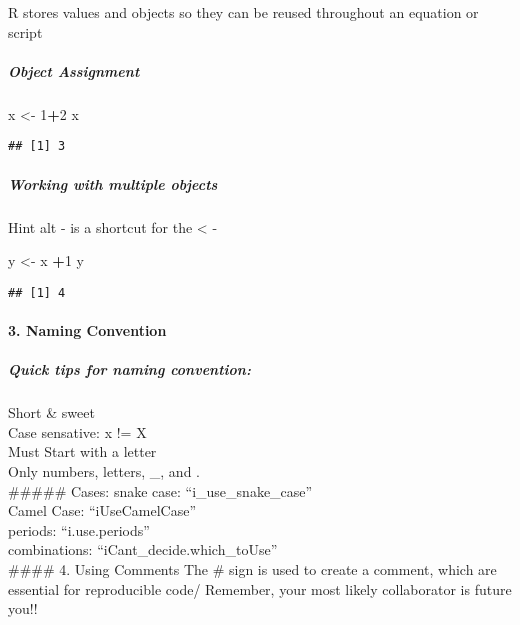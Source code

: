 \documentclass[]{article}
\newenvironment{Shaded}{\begin{snugshade}}{\end{snugshade}}
\newcommand{\DecValTok}[1]{\textcolor[rgb]{0.00,0.00,0.81}{#1}}
\newcommand{\StringTok}[1]{\textcolor[rgb]{0.31,0.60,0.02}{#1}}
\newcommand{\OperatorTok}[1]{\textcolor[rgb]{0.81,0.36,0.00}{\textbf{#1}}}
\newcommand{\NormalTok}[1]{#1}
\let\oldparagraph\paragraph
\renewcommand{\paragraph}[1]{\oldparagraph{#1}\mbox{}}
\let\oldsubparagraph\subparagraph
\renewcommand{\subparagraph}[1]{\oldsubparagraph{#1}\mbox{}}
\begin{document}
R stores values and objects so they can be reused throughout an equation
or script

\subparagraph{Object Assignment}\label{object-assignment}

\begin{Shaded}
\begin{Highlighting}[]
\NormalTok{x <-}\StringTok{ }\DecValTok{1}\OperatorTok{+}\DecValTok{2}
\NormalTok{x}
\end{Highlighting}
\end{Shaded}

\begin{verbatim}
## [1] 3
\end{verbatim}

\subparagraph{Working with multiple
objects}\label{working-with-multiple-objects}

Hint alt - is a shortcut for the \textless{} -

\begin{Shaded}
\begin{Highlighting}[]
\NormalTok{y <-}\StringTok{ }\NormalTok{x }\OperatorTok{+}\DecValTok{1}
\NormalTok{y}
\end{Highlighting}
\end{Shaded}

\begin{verbatim}
## [1] 4
\end{verbatim}

\paragraph{3. Naming Convention}\label{naming-convention}

\subparagraph{Quick tips for naming
convention:}\label{quick-tips-for-naming-convention}

Short \& sweet\\
Case sensative: x != X\\
Must Start with a letter\\
Only numbers, letters, \_, and .\\
\#\#\#\#\# Cases: snake case: ``i\_use\_snake\_case''\\
Camel Case: ``iUseCamelCase''\\
periods: ``i.use.periods''\\
combinations: ``iCant\_decide.which\_toUse''\\
\#\#\#\# 4. Using Comments The \# sign is used to create a comment,
which are essential for reproducible code/ Remember, your most likely
collaborator is future you!!
\end{document}
